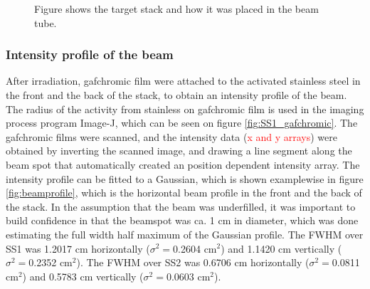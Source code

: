 \documentclass[a4paper,11pt,twoside]{book}
\begin{document}
\begin{figure}%
    \centering
    \caption{Figure shows the target stack and how it was placed in the beam tube.}%
    \label{fig:targetstack}%
\end{figure}


\subsubsection{Intensity profile of the beam}

After irradiation, gafchromic film were attached to the activated stainless steel in the front and the back of the stack, to obtain an intensity profile of the beam. The radius of the activity from stainless on gafchromic film is used in the imaging process program Image-J, which can be seen on figure \ref{fig:SS1_gafchromic}. The gafchromic films were scanned, and the intensity data (\textcolor{red}{x and y arrays}) were obtained by inverting the scanned image, and drawing a line segment along the beam spot that automatically created an position dependent intensity array. The intensity profile can be fitted to a Gaussian, which is shown examplewise in figure \ref{fig:beamprofile}, which is the horizontal beam profile in the front and the back of the stack. In the assumption that the beam was underfilled, it was important to build confidence in that the beamspot was ca. 1 cm in diameter, which was done estimating the full width half maximum of the Gaussian profile. The FWHM over SS1 was 1.2017 cm horizontally ($\sigma^2=$0.2604 cm$^2$) and 1.1420 cm vertically ($\sigma^2=$0.2352 cm$^2$). The FWHM over SS2 was 0.6706 cm horizontally ($\sigma^2=$0.0811 cm$^2$) and 0.5783 cm vertically ($\sigma^2=$0.0603 cm$^2$). \\
\end{document}
